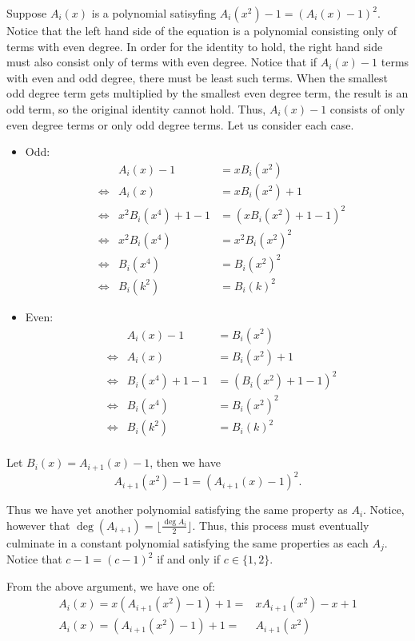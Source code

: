 \documentclass{article}
\begin{document}
\begin{enumerate}
Suppose $A_i(x)$ is a polynomial satisyfing $A_i(x^2) - 1 = (A_i(x) - 1)^2$. Notice that the left hand side of the equation is a polynomial consisting only of terms with even degree. In order for the identity to hold, the right hand side must also consist only of terms with even degree. Notice that if $A_i(x) - 1$ terms with even and odd degree, there must be least such terms. When the smallest odd degree term gets multiplied by the smallest even degree term, the result is an odd term, so the original identity cannot hold. Thus, $A_i(x) - 1$ consists of only even degree terms or only odd degree terms. Let us consider each case.
\begin{itemize}
    \item Odd: 
    \begin{align*}
        & &A_i(x) - 1 &= x B_{i}(x^2) \\
        &\iff &A_i(x) &= xB_{i}(x^2) + 1 \\
        &\iff &x^2B_{i}(x^4) + 1 - 1 &= (xB_{i}(x^2) + 1 - 1)^2 \\
        &\iff &x^2B_{i}(x^4) &= x^2 {B_{i}(x^2)}^2 \\
        &\iff &B_{i}(x^4) &= {B_{i}(x^2)}^2 \\
        &\iff &B_{i}(k^2) &= {B_{i}(k)}^2
    \end{align*}
    \item Even:
    \begin{align*}
        & &A_i(x) - 1 &= B_{i}(x^2) \\
        &\iff &A_i(x) &= B_{i}(x^2) + 1 \\
        &\iff &B_{i}(x^4) + 1 - 1 &= (B_{i}(x^2) + 1 - 1)^2 \\
        &\iff &B_{i}(x^4) &= {B_{i}(x^2)}^2 \\
        &\iff &B_{i}(k^2) &= {B_{i}(k)}^2 \\
    \end{align*}
\end{itemize}

Let $B_{i}(x) = A_{i + 1}(x) - 1$, then we have 
$$A_{i + 1}(x^2) - 1 = (A_{i + 1}(x) - 1)^2.$$

Thus we have yet another polynomial satisfying the same property as $A_i$. Notice, however that $\deg(A_{i + 1}) = \lfloor \frac{\deg A_i}{2} \rfloor$. Thus, this process must eventually culminate in a constant polynomial satisfying the same properties as each $A_j$. Notice that $c - 1 = (c - 1)^2$ if and only if $c \in \{1, 2\}$.

From the above argument, we have one of: 
\begin{align*}
    A_i(x) = x(A_{i + 1}(x^2) - 1) + 1 =& xA_{i + 1}(x^2) - x + 1 \\
    A_i(x) = (A_{i + 1}(x^2) - 1) + 1 =& A_{i + 1}(x^2)
\end{align*}


\end{enumerate}
\end{document}
